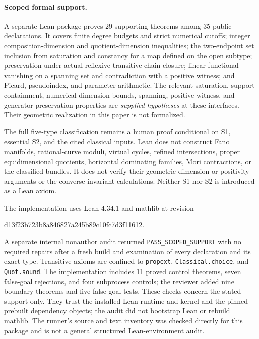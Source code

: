 \paragraph{Scoped formal support.}
A separate Lean package proves 29 supporting theorems among 35 public
declarations. It covers finite degree budgets and strict numerical cutoffs;
integer composition-dimension and quotient-dimension inequalities; the
two-endpoint set inclusion from saturation and constancy for a map defined
on the open subtype; preservation under actual reflexive-transitive chain
closure; linear-functional vanishing on a spanning set and contradiction
with a positive witness; and Picard, pseudoindex, and parameter arithmetic.
The relevant saturation, support containment, numerical dimension bounds,
spanning, positive witness, and generator-preservation properties are
\emph{supplied hypotheses} at these interfaces. Their geometric realization
in this paper is not formalized.

The full five-type classification remains a human proof conditional on S1,
essential S2, and the cited classical inputs. Lean does not construct Fano
manifolds, rational-curve moduli, virtual cycles, refined intersections,
proper equidimensional quotients, horizontal dominating families, Mori
contractions, or the classified bundles. It does not verify their geometric
dimension or positivity arguments or the converse invariant calculations.
Neither S1 nor S2 is introduced as a Lean axiom.

The implementation uses Lean 4.34.1 and mathlib at revision
\begin{center}\small\ttfamily
d13f23b723b8a846827a245b89c10fc7d3f11612.
\end{center}
A separate internal nonauthor audit returned \texttt{PASS\_SCOPED\_SUPPORT}
with no required repairs after a fresh build and examination of every
declaration and its exact type. Transitive axioms are confined to
\texttt{propext}, \texttt{Classical.choice}, and \texttt{Quot.sound}.
The implementation includes 11 proved control theorems, seven false-goal
rejections, and four subprocess controls; the reviewer added nine boundary
theorems and five false-goal tests. These checks concern the stated support
only. They trust the installed Lean runtime and kernel and the pinned
prebuilt dependency objects; the audit did not bootstrap Lean or rebuild
mathlib. The runner's source and text inventory was checked directly for
this package and is not a general structured Lean-environment audit.
